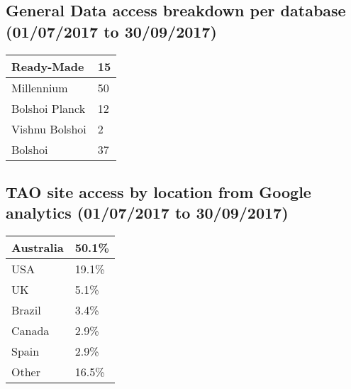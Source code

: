 \documentclass{article}%
\begin{document}
\subsection{General Data access breakdown per database (01/07/2017 to 30/09/2017)}%

%
\begin{longtabu}{X[l] X[l]}%
Ready{-}Made&15\\%
\hline%
Millennium&50\\%
\hline%
Bolshoi Planck&12\\%
\hline%
Vishnu Bolshoi&2\\%
\hline%
Bolshoi&37\\%
\hline%
\end{longtabu}%
\subsection{TAO site access by location from Google analytics (01/07/2017 to 30/09/2017)}%

%
\begin{longtabu}{X[l] X[l]}%
Australia&50.1\%\\%
\hline%
USA&19.1\%\\%
\hline%
UK&5.1\%\\%
\hline%
Brazil&3.4\%\\%
\hline%
Canada&2.9\%\\%
\hline%
Spain&2.9\%\\%
\hline%
Other&16.5\%\\%
\hline%
\end{longtabu}%
\end{document}
